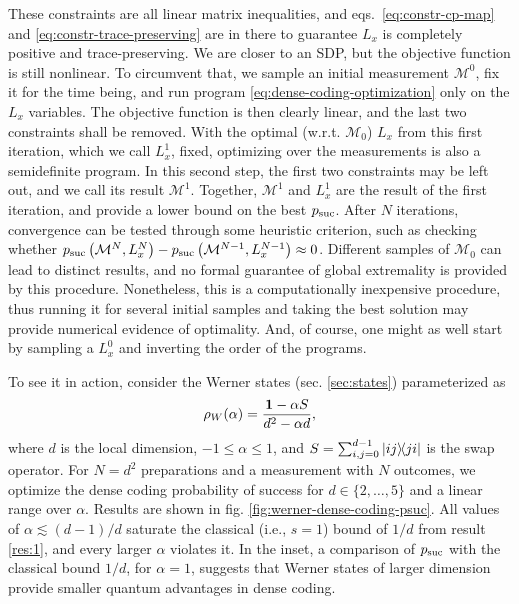		These constraints are all linear matrix inequalities, and eqs.~\eqref{eq:constr-cp-map} and \eqref{eq:constr-trace-preserving} are in there to guarantee $L_x$ is completely positive and trace-preserving. We are closer to an SDP, but the objective function is still nonlinear. To circumvent that, we sample an initial measurement $\mathcal{M}^0$, fix it for the time being, and run program \ref{eq:dense-coding-optimization} only on the $L_x$ variables. The objective function is then clearly linear, and the last two constraints shall be removed. With the optimal (w.r.t. $\mathcal{M}_0$) $L_x$ from this first iteration, which we call $L_x^1$, fixed, optimizing over the measurements is also a semidefinite program. In this second step, the first two constraints may be left out, and we call its result $\mathcal{M}^1$. Together, $\mathcal{M}^1$ and $L_x^1$ are the result of the first iteration, and provide a lower bound on the best $p_{\text{suc}}$. After $N$ iterations, convergence can be tested through some heuristic criterion, such as checking whether $p_{\text{suc}} \left( \mathcal{M}^N, L_x^N \right) - p_{\text{suc}} \left( \mathcal{M}^{N-1}, L_x^{N-1} \right) \approx 0$. Different samples of $\mathcal{M}_0$ can lead to distinct results, and no formal guarantee of global extremality is provided by this procedure. Nonetheless, this is a computationally inexpensive procedure, thus running it for several initial samples and taking the best solution may provide numerical evidence of optimality. And, of course, one might as well start by sampling a $L_x^0$ and inverting the order of the programs.

        To see it in action, consider the Werner states (sec. \ref{sec:states}) parameterized as
        \begin{equation}
            \rho_W ( \alpha ) = \frac{\mathbf{1} - \alpha S}{d^2 - \alpha d} ,
            \label{eq:werner-dense-coding}
        \end{equation}
        where $d$ is the local dimension, $-1 \leq \alpha \leq 1$, and $S = \sum_{i,j=0}^{d-1} \ketbra{ij}{ji}$ is the swap operator. For $N = d^2$ preparations and a measurement with $N$ outcomes, we optimize the dense coding probability of success for $d \in \{2, \ldots, 5\}$ and a linear range over $\alpha$. Results are shown in fig. \ref{fig:werner-dense-coding-psuc}. All values of $\alpha \lesssim (d-1)/d$ saturate the classical (i.e., $s=1$) bound of $1/d$ from result \ref{res:1}, and every larger $\alpha$ violates it. In the inset, a comparison of $p_{\text{suc}}$ with the classical bound $1/d$, for $\alpha = 1$, suggests that Werner states of larger dimension provide smaller quantum advantages in dense coding.

